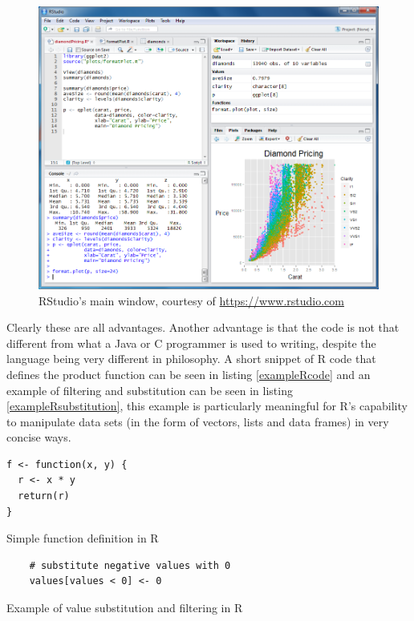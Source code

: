 \documentclass[12pt,a4paper,titlepage]{report}
\begin{document}
\begin{figure}[h]
    \centering
    \includegraphics[width=1\textwidth]{drstudio-windows}
    \caption{RStudio's main window, courtesy of \url{https://www.rstudio.com}}
    \label{rstudiomainwindow}
\end{figure}

Clearly these are all advantages. Another advantage is that the code is not that different from what a Java or C programmer is used to writing, despite the language being very different in philosophy. A short snippet of R code that defines the product function can be seen in listing \ref{exampleRcode} and an example of filtering and substitution can be seen in listing \ref{exampleRsubstitution}, this example is particularly meaningful for R's capability to manipulate data sets (in the form of vectors, lists and data frames) in very concise ways.

\begin{listing}[h]
\begin{verbatim}
f <- function(x, y) {
  r <- x * y
  return(r)
}
\end{verbatim}

\caption{Simple function definition in R}
\label{exampleRcode}
\end{listing}

\begin{listing}[h]
    \begin{verbatim}
    # substitute negative values with 0
    values[values < 0] <- 0
    \end{verbatim}
    
    \caption{Example of value substitution and filtering in R}
    \label{exampleRsubstitution}
\end{listing}
\end{document}
